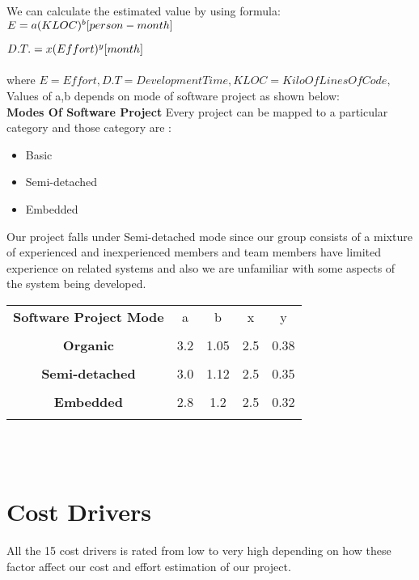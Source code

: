 \documentclass{article}
\begin{document}
We can calculate the estimated value by using formula:\\ 
$
\\E=a(KLOC)^b  [person-month]
$

$\\D.T. = x(Effort)^y   [month]$ \\ \\
where $ E = Effort,  D.T = Development Time, KLOC=  Kilo Of Lines Of Code,$\\
 Values of a,b depends on mode of software project as shown below:\\
 
 \textbf{Modes Of Software Project}
 Every project can be mapped to a particular category and those category are :\\
 \begin{itemize}
    

 \item Basic
 \item Semi-detached
 \item Embedded
  \end{itemize}
 
  Our project falls under Semi-detached mode since our group consists of a mixture of experienced and inexperienced members and team members have limited experience on related systems and also we are unfamiliar with some aspects of the system being developed. \\
  
 \begin{tabular}{c c c c c}
  \textbf{Software Project Mode} & a &b & x & y \\ \\
 
 \textbf{Organic} & 3.2 & 1.05 & 2.5 & 0.38  \\ \\
 \textbf{Semi-detached} & 3.0 & 1.12 & 2.5 & 0.35\\ \\
 \textbf{Embedded} & 2.8 & 1.2  & 2.5 & 0.32\\ \\
 
 \end{tabular}\\ \\
 
 \section{Cost Drivers}
 All the 15 cost drivers is rated from low to very high depending on how these factor affect our cost and effort estimation of our project.
 
\end{document}
